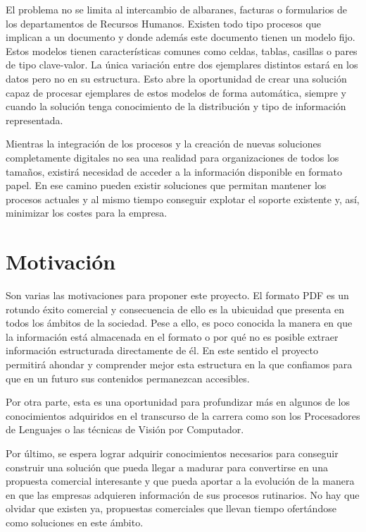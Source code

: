 El problema no se limita al intercambio de albaranes, facturas o formularios de los departamentos de Recursos Humanos. Existen todo tipo procesos que implican a un documento y donde además este documento tienen un modelo fijo. Estos modelos tienen características comunes como celdas, tablas, casillas o pares de tipo clave-valor. La única variación entre dos ejemplares distintos estará en los datos pero no en su estructura. Esto abre la oportunidad de crear una solución capaz de procesar ejemplares de estos modelos de forma automática, siempre y cuando la solución tenga conocimiento de la distribución y tipo de información representada. 

Mientras la integración de los procesos y la creación de nuevas soluciones completamente digitales no sea una realidad para organizaciones de todos los tamaños, existirá necesidad de acceder a la información disponible en formato papel. En ese camino pueden existir soluciones que permitan mantener los procesos actuales y al mismo tiempo conseguir explotar el soporte existente y, así, minimizar los costes para la empresa. 

\section{Motivación}

Son varias las motivaciones para proponer este proyecto. El formato PDF es un rotundo éxito comercial y consecuencia de ello es la ubicuidad que presenta en todos los ámbitos de la sociedad. Pese a ello, es poco conocida la manera en que la información está almacenada en el formato o por qué no es posible extraer información estructurada directamente de él. En este sentido el proyecto permitirá ahondar y comprender mejor esta estructura en la que confiamos para que en un futuro sus contenidos permanezcan accesibles.

Por otra parte, esta es una oportunidad para profundizar más en algunos de los conocimientos adquiridos en el transcurso de la carrera como son los Procesadores de Lenguajes o las técnicas de Visión por Computador.

Por último, se espera lograr adquirir conocimientos necesarios para conseguir construir una solución que pueda llegar a madurar para convertirse en una propuesta comercial interesante y que pueda aportar a la evolución de la manera en que las empresas adquieren información de sus procesos rutinarios. No hay que olvidar que existen ya, propuestas comerciales que llevan tiempo ofertándose como soluciones en este ámbito.

